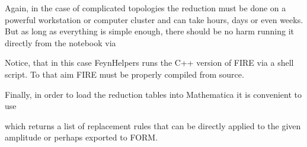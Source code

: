 \documentclass[../FeynHelpersManual.tex]{subfiles}
\begin{document}
Again, in the case of complicated topologies the reduction must be done
on a powerful workstation or computer cluster and can take hours, days
or even weeks. But as long as everything is simple enough, there should
be no harm running it directly from the notebook via

\begin{Shaded}
\begin{Highlighting}[]
\OperatorTok{[}\OperatorTok{[],}\OperatorTok{]}
\end{Highlighting}
\end{Shaded}

Notice, that in this case FeynHelpers runs the C++ version of FIRE via a
shell script. To that aim FIRE must be properly compiled from source.

Finally, in order to load the reduction tables into Mathematica it is
convenient to use

\begin{Shaded}
\begin{Highlighting}[]
\ExtensionTok{=}\OperatorTok{[}\OperatorTok{,}\OperatorTok{[]]}
\end{Highlighting}
\end{Shaded}

which returns a list of replacement rules that can be directly applied
to the given amplitude or perhaps exported to FORM.
\end{document}
